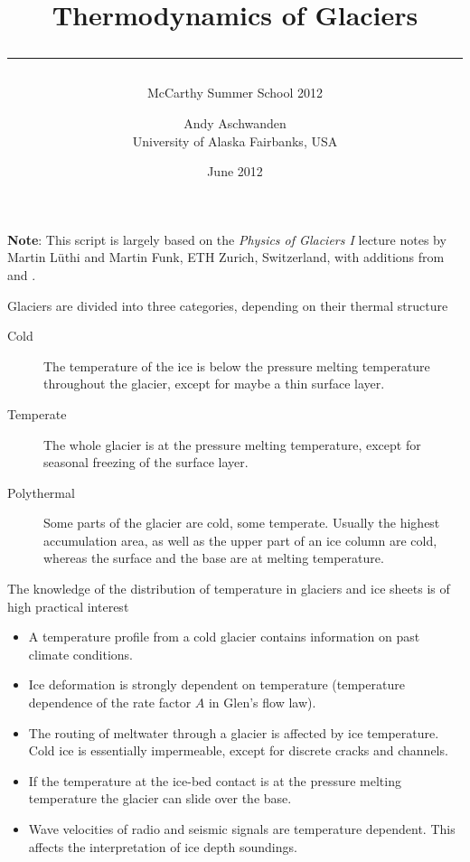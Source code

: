 \documentclass[parskip=half]{scrartcl}
\begin{document}
\title{Thermodynamics of Glaciers\\[.5em]
\rule[1.em]{\textwidth}{2pt}}
\subtitle{McCarthy Summer School 2012}

\date{June 2012}

\author{
  \small Andy Aschwanden\\[-.5em] 
 \small University of Alaska Fairbanks, USA}


\maketitle

{\bf Note}: This script is largely based on the \emph{Physics of Glaciers I} lecture notes by Martin L\"uthi and Martin Funk, ETH Zurich, Switzerland, with additions from \cite{GreveBlatter_disg} and \cite{Gusmeroli2010}.

\vspace{1em}

Glaciers are divided into three categories, depending on their thermal
structure
%
\begin{description}
\item[Cold] The temperature of the ice is below the pressure melting temperature
 throughout the glacier, except for maybe a thin surface layer.
\item[Temperate] The whole glacier is at the pressure melting temperature, except
 for seasonal freezing of the surface layer.
\item[Polythermal] Some parts of the glacier are cold, some temperate.
 Usually the highest accumulation area, as well as the upper part of an ice
 column are cold, whereas the surface and the base are at melting
 temperature.
\end{description}
%
The knowledge of the distribution of temperature in glaciers and ice sheets is
of high practical interest
%
\begin{itemize}\itemsep0ex
\item A temperature profile from a cold glacier contains information on past
 climate conditions.
\item Ice deformation is strongly dependent on temperature (temperature
 dependence of the rate factor $A$ in Glen's flow law).
\item The routing of meltwater through a glacier is affected by ice
 temperature.  Cold ice is essentially impermeable, except for discrete
 cracks and channels.
\item If the temperature at the ice-bed contact is at the pressure melting
 temperature the glacier can slide over the base.
\item Wave velocities of radio and seismic signals are temperature
 dependent. This affects the interpretation of ice depth soundings.
\end{itemize}
\end{document}
